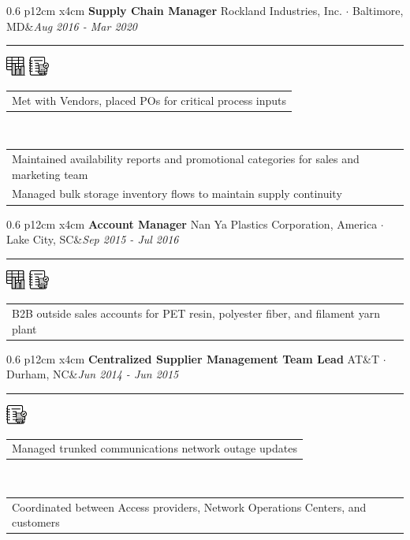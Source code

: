 \documentclass[10pt,A4]{article}
\newcommand{\tzlarrow}{(0,0) -- (0.2,0) -- (0.3,0.2) -- (0.2,0.4) -- (0,0.4) -- (0.1,0.2) -- cycle;}
\newcommand{\larrow}[1]
{\begin{tikzpicture}[scale=0.58]
	 \filldraw[fill=#1!100,draw=#1!100!black]  \tzlarrow
 \end{tikzpicture}
}
\newcommand{\cvevent}[5]
{
\vspace{8pt}
	\begin{tabular*}{0.6\linewidth}{ p{12cm} x{4cm}}
\textbf{#2} \hspace{4pt} {#3}&\textit{#1}\\[4pt]
	\end{tabular*}
        
        \vspace{-3pt}

\textcolor{softcol}{\hrule}
\vspace{-2pt}
\hspace{14.3cm}
#4 \\[-18pt-6pt]
\vspace{6pt}
	\begin{tabular*}{1\textwidth}{l}
	\vspace{-0.85cm} \larrow{sectcol} #5\\[4.5pt]
	\end{tabular*}
}
\newcommand{\cveventshort}[5]
{
\vspace{8pt}
	\begin{tabular*}{0.6\linewidth}{ p{12cm} x{4cm}}
\textbf{#2} \hspace{4pt} {#3}&\textit{#1}\\[4pt]
	\end{tabular*}
        
        \vspace{-3pt}
        
\textcolor{softcol}{\hrule}
\vspace{-2pt}
\hspace{14.3cm}
#4 \\[-18pt-6pt]
\vspace{6pt}
	\begin{tabular*}{1\textwidth}{l}
	\vspace{-0.85cm} \larrow{sectcol} #5\\[6pt]
	\end{tabular*}
\vspace{-3pt}
}
\newcommand{\oneextra}[1]
{ \vspace{-0.85cm+24pt} \\
\begin{tabular*}{1\textwidth}{l}
		 \larrow{softcol}  #1\\[6pt]
	\end{tabular*}
\vspace{-3pt}
}
\newcommand{\twoextra}[2]
{ \vspace{-0.85cm+24pt} \\
\begin{tabular*}{1\textwidth}{l}
		 \larrow{softcol}  #1\\[4.5pt]
		 \larrow{softcol}  #2\\[6pt]
	\end{tabular*}
\vspace{-3pt}
}
\begin{document}
\begin{minipage}[c][0.5\textheight][t]{\linewidth}
{%

%
  \cvevent{Aug 2016 - Mar 2020}{Supply Chain Manager}{Rockland Industries, Inc.  $\cdot$  Baltimore, MD}
{ \hspace{20.2222pt} \includegraphics[height=18pt]{img/chartgraphic} \hspace{2pt} \includegraphics[height=18pt]{img/notebookgraphic}}
{Met with Vendors, placed POs for critical process inputs}
  \twoextra{Maintained availability reports and promotional categories for sales and marketing team}{Managed bulk storage inventory flows to maintain supply continuity}


%
  \cveventshort{Sep 2015 - Jul 2016}{Account Manager}{Nan Ya Plastics Corporation, America  $\cdot$  Lake City, SC}
{ \hspace{20.2222pt} \includegraphics[height=18pt]{img/chartgraphic} \hspace{2pt} \includegraphics[height=18pt]{img/notebookgraphic}}
{B2B outside sales accounts for PET resin, polyester fiber, and filament yarn plant}



%
  \cvevent{Jun 2014 - Jun 2015}{Centralized Supplier Management Team Lead}{AT\&T  $\cdot$  Durham, NC}
{ \hspace{45.2222pt}  \includegraphics[height=18pt]{img/notebookgraphic}}
{Managed trunked communications network outage updates}
  \oneextra{Coordinated between Access providers, Network Operations Centers, and customers}
}

\end{minipage} \\ [24pt]
\end{document}
